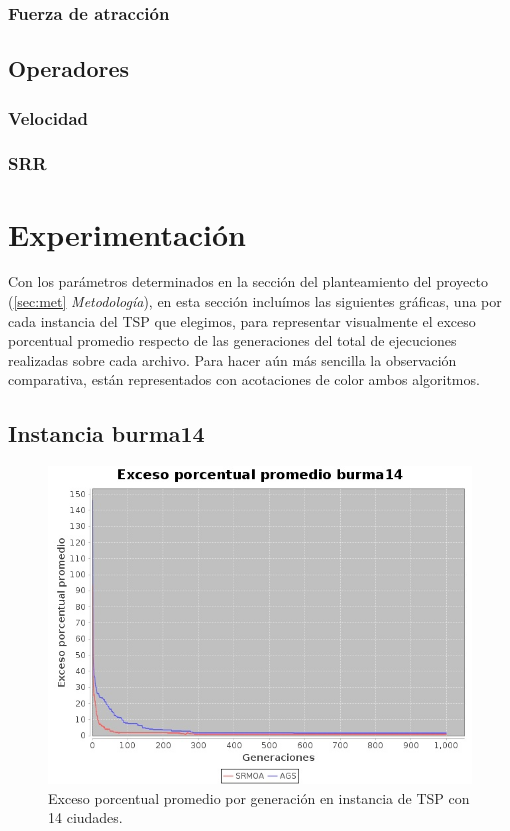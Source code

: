 \documentclass[12pt]{article}
\begin{document}
\subsubsection*{Fuerza de atracción}

\subsection*{Operadores}
\subsubsection*{Velocidad}\label{sec:vel}

\subsubsection*{SRR}
\newpage
\section{Experimentación}
Con los parámetros determinados en la sección del planteamiento del
proyecto (\ref{sec:met} \textit{Metodología}), en esta sección incluímos las siguientes gráficas, una por cada instancia del TSP que elegimos, para representar visualmente el exceso porcentual promedio respecto de las generaciones del total de ejecuciones realizadas sobre cada archivo.
Para hacer aún más sencilla la observación comparativa, están representados con acotaciones de color ambos algoritmos.

\subsection{Instancia burma14}
\begin{figure}[H]
  \centering
  \includegraphics[width=1\textwidth]{graficas/burma14}
  \caption{Exceso porcentual promedio por generación en instancia de TSP con 14 ciudades.}
\end{figure}
\end{document}
